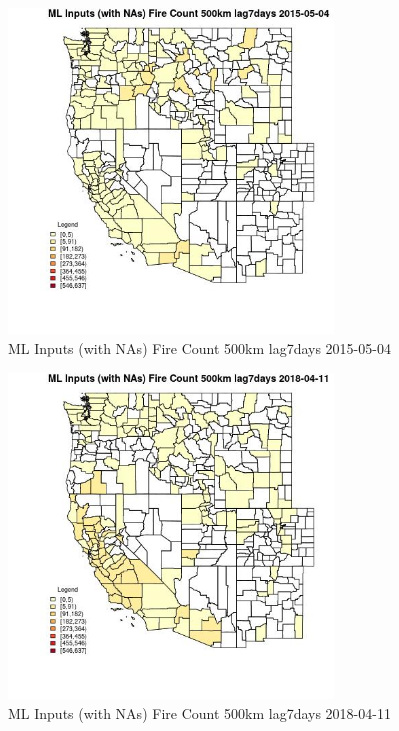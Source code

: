 \begin{figure} 
\centering  
\includegraphics[width=0.77\textwidth]{Code_Outputs/Report_ML_input_PM25_Step4_part_e_de_duplicated_aves_compiled_2019-05-18wNAs_CountyFire_Count_500km_lag7daysMean2015-05-04.jpg} 
\caption{\label{fig:Report_ML_input_PM25_Step4_part_e_de_duplicated_aves_compiled_2019-05-18wNAsCountyFire_Count_500km_lag7daysMean2015-05-04}ML Inputs (with NAs) Fire Count 500km lag7days 2015-05-04} 
\end{figure} 
 

\clearpage 

\begin{figure} 
\centering  
\includegraphics[width=0.77\textwidth]{Code_Outputs/Report_ML_input_PM25_Step4_part_e_de_duplicated_aves_compiled_2019-05-18wNAs_CountyFire_Count_500km_lag7daysMean2018-04-11.jpg} 
\caption{\label{fig:Report_ML_input_PM25_Step4_part_e_de_duplicated_aves_compiled_2019-05-18wNAsCountyFire_Count_500km_lag7daysMean2018-04-11}ML Inputs (with NAs) Fire Count 500km lag7days 2018-04-11} 
\end{figure} 
 


